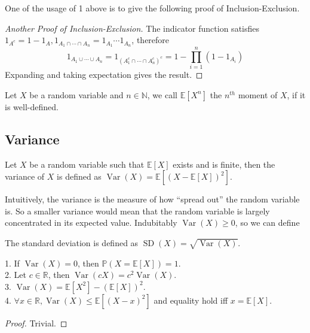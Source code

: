 One of the usage of 1 above is to give the following proof of Inclusion-Exclusion.
\begin{proof}[Another Proof of Inclusion-Exclusion]
    The indicator function satisfies $1_{A^c}=1-1_A,1_{A_1\cap\cdots\cap A_n}=1_{A_1}\cdots 1_{A_n}$, therefore
    $$1_{A_1\cup\cdots\cup A_n}=1_{(A_1^c\cap\cdots\cap A_n^c)^c}=1-\prod_{i=1}^n(1-1_{A_i})$$
    Expanding and taking expectation gives the result.
\end{proof}
\begin{definition}
    Let $X$ be a random variable and $n\in\mathbb N$, we call $\mathbb E[X^n]$ the $n^{th}$ moment of $X$, if it is well-defined.
\end{definition}
\subsection{Variance}
\begin{definition}
    Let $X$ be a random variable such that $\mathbb E[X]$ exists and is finite, then the variance of $X$ is defined as $\operatorname{Var}(X)=\mathbb E[(X-\mathbb E[X])^2]$.
\end{definition}
Intuitively, the variance is the measure of how ``spread out'' the random variable is.
So a smaller variance would mean that the random variable is largely concentrated in its expected value.
Indubitably $\operatorname{Var}(X)\ge 0$, so we can define
\begin{definition}
    The standard deviation is defined as $\operatorname{SD}(X)=\sqrt{\operatorname{Var}(X)}$.
\end{definition}
\begin{proposition}
    1. If $\operatorname{Var}(X)=0$, then $\mathbb P(X=\mathbb E[X])=1$.\\
    2. Let $c\in\mathbb R$, then $\operatorname{Var}(cX)=c^2\operatorname{Var}(X)$.\\
    3. $\operatorname{Var}(X)=\mathbb E[X^2]-(\mathbb E[X])^2$.\\
    4. $\forall x\in\mathbb R,\operatorname{Var}(X)\le \mathbb E[(X-x)^2]$ and equality hold iff $x=\mathbb E[X]$.
\end{proposition}
\begin{proof}
    Trivial.
\end{proof}
